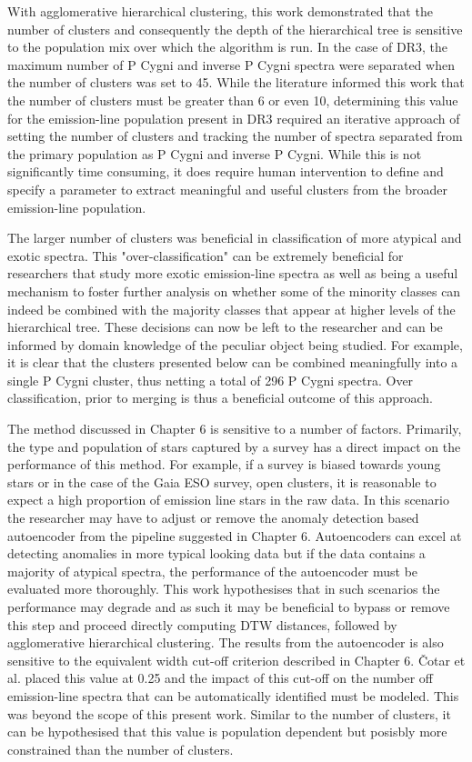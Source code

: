 With agglomerative hierarchical clustering, this work demonstrated that the number of clusters and consequently the depth of the hierarchical tree is sensitive to the population mix over which the algorithm is run. In the case of DR3, the maximum number of P Cygni and inverse P Cygni spectra were separated when the number of clusters was set to 45. While the literature informed this work that the number of clusters must be greater than 6 or even 10, determining this value for the emission-line population present in DR3 required an iterative approach of setting the number of clusters and tracking the number of spectra separated from the primary population as P Cygni and inverse P Cygni. While this is not significantly time consuming, it does require human intervention to define and specify a parameter to extract meaningful and useful clusters from the broader emission-line population. 

The larger number of clusters was beneficial in classification of more atypical and exotic spectra. This "over-classification" can be extremely beneficial for researchers that study more exotic emission-line spectra as well as being a useful mechanism to foster further analysis on whether some of the minority classes can indeed be combined with the majority classes that appear at higher levels of the hierarchical tree. These decisions can now be left to the researcher and can be informed by domain knowledge of the peculiar object being studied. For example, it is clear that the clusters presented below can be combined meaningfully into a single P Cygni cluster, thus netting a total of 296 P Cygni spectra. Over classification, prior to merging is thus a beneficial outcome of this approach. 

The method discussed in Chapter 6 is sensitive to a number of factors. Primarily, the type and population of stars captured by a survey has a direct impact on the performance of this method. For example, if a survey is biased towards young stars or in the case of the Gaia ESO survey, open clusters, it is reasonable to expect a high proportion of emission line stars in the raw data. In this scenario the researcher may have to adjust or remove the anomaly detection based autoencoder from the pipeline suggested in Chapter 6. Autoencoders can excel at detecting anomalies in more typical looking data but if the data contains a majority of atypical spectra, the performance of the autoencoder must be evaluated more thoroughly. This work hypothesises that in such scenarios the performance may degrade and as such it may be beneficial to bypass or remove this step and proceed directly computing DTW distances, followed by agglomerative hierarchical clustering. The results from the autoencoder is also sensitive to the equivalent width cut-off criterion described in Chapter 6. Čotar et al. placed this value at 0.25 and the impact of this cut-off on the number off emission-line spectra that can be automatically identified must be modeled. This was beyond the scope of this present work. Similar to the number of clusters, it can be hypothesised that this value is population dependent but posisbly more constrained than the number of clusters.

